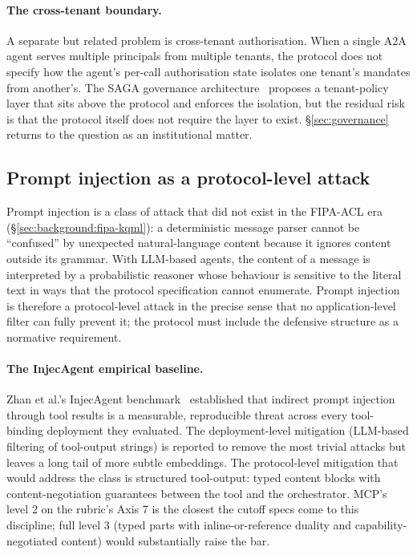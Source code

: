 \paragraph{The cross-tenant boundary.}
A separate but related problem is cross-tenant
authorisation. When a single A2A agent serves multiple
principals from multiple tenants, the protocol does not
specify how the agent's per-call authorisation state
isolates one tenant's mandates from another's. The SAGA
governance architecture~\cite{saga2026} proposes a
tenant-policy layer that sits above the protocol and
enforces the isolation, but the residual risk is that the
protocol itself does not require the layer to exist.
\S\ref{sec:governance} returns to the question as an
institutional matter.

\subsection{Prompt injection as a protocol-level attack}
\label{sec:security:injection}

Prompt injection is a class of attack that did not exist
in the FIPA-ACL era (\S\ref{sec:background:fipa-kqml}): a
deterministic message parser cannot be ``confused'' by
unexpected natural-language content because it ignores
content outside its grammar. With LLM-based agents, the
content of a message is interpreted by a probabilistic
reasoner whose behaviour is sensitive to the literal text
in ways that the protocol specification cannot enumerate.
Prompt injection is therefore a protocol-level attack in
the precise sense that no application-level filter can
fully prevent it; the protocol must include the
defensive structure as a normative requirement.

\paragraph{The InjecAgent empirical baseline.}
Zhan et al.'s InjecAgent benchmark~\cite{zhan2024injecagent}
established that indirect prompt injection through tool
results is a measurable, reproducible threat across every
tool-binding deployment they evaluated. The
deployment-level mitigation (LLM-based filtering of
tool-output strings) is reported to remove the most
trivial attacks but leaves a long tail of more subtle
embeddings. The protocol-level mitigation that would
address the class is structured tool-output: typed
content blocks with content-negotiation guarantees
between the tool and the orchestrator. MCP's level 2 on
the rubric's Axis 7 is the closest the cutoff specs come
to this discipline; full level 3 (typed parts with
inline-or-reference duality and capability-negotiated
content) would substantially raise the bar.

